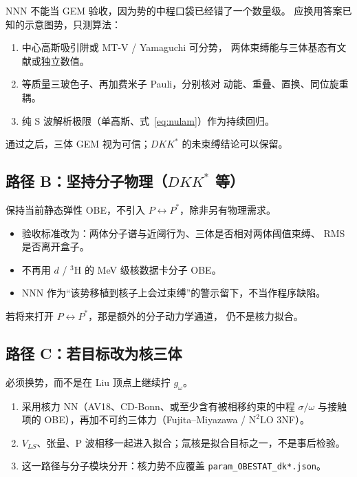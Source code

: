 \documentclass[12pt,a4paper]{article}
\begin{document}
NNN 不能当 GEM 验收，因为势的中程口袋已经错了一个数量级。
应换用答案已知的示意图势，只测算法：

\begin{enumerate}
  \item 中心高斯吸引阱或 MT-V / Yamaguchi 可分势，
        两体束缚能与三体基态有文献或独立数值。
  \item 等质量三玻色子、再加费米子 Pauli，分别核对
        动能、重叠、置换、同位旋重耦。
  \item 纯 S 波解析极限（单高斯、式~\eqref{eq:nulam}）作为持续回归。
\end{enumerate}

通过之后，三体 GEM 视为可信；$DKK^*$ 的未束缚结论可以保留。

\subsection{\texorpdfstring{路径 B：坚持分子物理（$DKK^*$ 等）}{路径 B：坚持分子物理（DKK* 等）}}

保持当前静态弹性 OBE，不引入 $P\leftrightarrow P^*$，除非另有物理需求。
\begin{itemize}
  \item 验收标准改为：两体分子谱与近阈行为、三体是否相对两体阈值束缚、
        RMS 是否离开盒子。
  \item 不再用 $d$ / ${}^3\mathrm{H}$ 的 MeV 级核数据卡分子 OBE。
  \item NNN 作为``该势移植到核子上会过束缚''的警示留下，不当作程序缺陷。
\end{itemize}

若将来打开 $P\leftrightarrow P^*$，那是额外的分子动力学通道，
仍不是核力拟合。

\subsection{路径 C：若目标改为核三体}

必须换势，而不是在 Liu 顶点上继续拧 $g_\omega$。

\begin{enumerate}
  \item 采用核力 NN（AV18、CD-Bonn、或至少含有被相移约束的中程 $\sigma/\omega$
        与接触项的 OBE），再加不可约三体力（Fujita--Miyazawa / $\mathrm{N}^2\mathrm{LO}$ 3NF）。
  \item $V_{LS}$、张量、P 波相移一起进入拟合；氚核是拟合目标之一，不是事后检验。
  \item 这一路径与分子模块分开：核力势不应覆盖 \texttt{param\_OBESTAT\_dk*.json}。
\end{enumerate}
\end{document}
